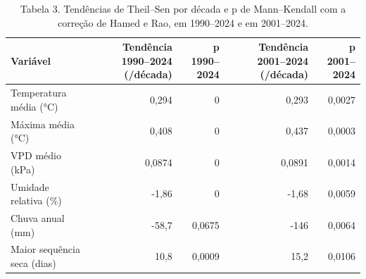 \begin{table}
\caption{Tabela 3. Tendências de Theil–Sen por década e p de Mann–Kendall com a correção de Hamed e Rao, em 1990–2024 e em 2001–2024.}
\label{tab:03_clima:xingu:tendencias}
\begin{tabular}{lrrrr}
\toprule
Variável & Tendência 1990–2024 (/década) & p 1990–2024 & Tendência 2001–2024 (/década) & p 2001–2024 \\
\midrule
Temperatura média (°C) & 0,294 & 0 & 0,293 & 0,0027 \\
Máxima média (°C) & 0,408 & 0 & 0,437 & 0,0003 \\
VPD médio (kPa) & 0,0874 & 0 & 0,0891 & 0,0014 \\
Umidade relativa (\%) & -1,86 & 0 & -1,68 & 0,0059 \\
Chuva anual (mm) & -58,7 & 0,0675 & -146 & 0,0064 \\
Maior sequência seca (dias) & 10,8 & 0,0009 & 15,2 & 0,0106 \\
\bottomrule
\end{tabular}
\end{table}

